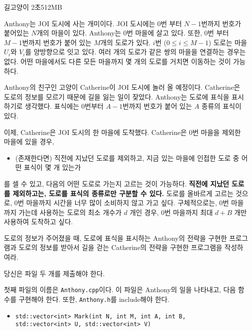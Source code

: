\begin{problem}{길고양이}
	{}{}
	{2초}{512MB}{}
	
	Anthony는 JOI 도시에 사는 개미이다. JOI 도시에는 $0$번 부터 $N-1$번까지 번호가 붙어있는 $N$개의 마을이 있다. Anthony는 $0$번 마을에 살고 있다. 또한, $0$번 부터 $M-1$번까지 번호가 붙어 있는 $M$개의 도로가 있다. $i$번 ($0 \le i \le M-1$) 도로는 마을 $U_i$와 $V_i$를 양방향으로 잇고 있다. 여러 개의 도로가 같은 쌍의 마을을 연결하는 경우는 없다. 어떤 마을에서도 다른 모든 마을까지 몇 개의 도로를 거치면 이동하는 것이 가능하다.
	
	Anthony의 친구인 고양이 Catherine이 JOI 도시에 놀러 올 예정이다. Catherine은 도로의 정보를 모르기 때문에 길을 잃는 일이 잦았다. Anthony는 도로에 표식을 표시하기로 생각했다. 표식에는 $0$번부터 $A-1$번까지 번호가 붙어 있는 $A$ 종류의 표식이 있다.
	
	이제, Catherine은 JOI 도시의 한 마을에 도착했다. Catherine은 $0$번 마을을 제외한 마을에 있을 경우, 
	
	\begin{itemize}
		\item[] (존재한다면) 직전에 지났던 도로를 제외하고, 지금 있는 마을에 인접한 도로 중 어떤 표식이 몇 개 있는가
	\end{itemize}
	
	를 셀 수 있고, 다음의 어떤 도로로 가는지 고르는 것이 가능하다. \textbf{직전에 지났던 도로를 제외하고는, 도로를 표식의 종류로만 구분할 수 있다.} 도로를 올바르게 고르는 것으로, $0$번 마을까지 시간을 너무 많이 소비하지 않고 가고 싶다. 구체적으로는, $0$번 마을까지 가는데 사용하는 도로의 최소 개수가 $d$ 개인 경우, $0$번 마을까지 최대 $d+B$ 개만 사용하여 도착하고 싶다.
	
	도로의 정보가 주어졌을 때, 도로에 표식을 표시하는 Anthony의 전략을 구현한 프로그램과 도로의 정보를 받아서 길을 걷는 Catherine의 전략을 구현한 프로그램을 작성하여라.
	
	\Specification
	
	당신은 파일 두 개를 제출해야 한다.
	
	첫째 파일의 이름은 \texttt{Anthony.cpp}이다. 이 파일은 Anthony의 일을 나타내고, 다음 함수를 구현해야 한다. 또한, \texttt{Anthony.h}를 include해야 한다.
	
	\begin{itemize}
		\item \texttt{std::vector<int> Mark(int N, int M, int A, int B,\\ \phantom{std::vector<int> Mark(}std::vector<int> U, std::vector<int> V)}
		

\end{itemize}
\end{problem}
